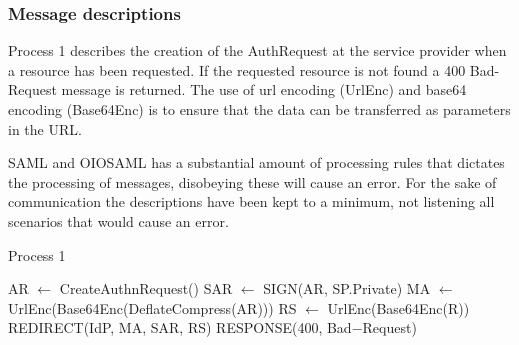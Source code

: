 \documentclass[twosided]{report}
\begin{document}
\subsubsection{Message descriptions}
Process 1 describes the creation of the AuthRequest at the service provider when a resource has been requested. If the requested resource is not found a 400 Bad-Request message is returned. The use of url encoding (UrlEnc) and base64 encoding (Base64Enc) is to ensure that the data can be transferred as parameters in the URL.
\par
SAML and OIOSAML has a substantial amount of processing rules that dictates the processing of messages, disobeying these will cause an error. For the sake of communication the descriptions have been kept to a minimum, not listening all scenarios that would cause an error.

\begin{algorithm}[H]
	\caption{Process 1}
	\begin{algorithmic}
		\STATE AR $\leftarrow$ CreateAuthnRequest()
		\STATE SAR $\leftarrow$ SIGN(AR, SP.Private)
		\STATE MA $\leftarrow$ UrlEnc(Base64Enc(DeflateCompress(AR)))
		\STATE RS $\leftarrow$ UrlEnc(Base64Enc(R))
		\RETURN REDIRECT(IdP, MA, SAR, RS)
	\ELSE
		\RETURN RESPONSE(400, Bad−Request)
	\ENDIF
	\end{algorithmic}
\end{algorithm}
\end{document}
